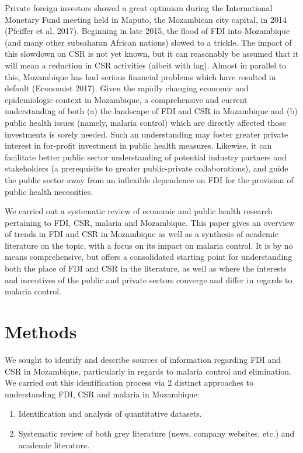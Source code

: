 \documentclass[]{article}
\providecommand{\tightlist}{%
  \setlength{\itemsep}{0pt}\setlength{\parskip}{0pt}}
\begin{document}
Private foreign investors showed a great optimism during the
International Monetary Fund meeting held in Maputo, the Mozambican city
capital, in 2014 (Pfeiffer et al. 2017). Beginning in late 2015, the
flood of FDI into Mozambique (and many other subsaharan African nations)
slowed to a trickle. The impact of this slowdown on CSR is not yet
known, but it can reasonably be assumed that it will mean a reduction in
CSR activities (albeit with lag). Almost in parallel to this, Mozambique
has had serious financial problems which have resulted in default
(Economist 2017). Given the rapidly changing economic and epidemiologic
context in Mozambique, a comprehensive and current understanding of both
(a) the landscape of FDI and CSR in Mozambique and (b) public health
issues (namely, malaria control) which are directly affected those
investments is sorely needed. Such an understanding may foster greater
private interest in for-profit investment in public health measures.
Likewise, it can facilitate better public sector understanding of
potential industry partners and stakeholders (a prerequisite to greater
public-private collaborations), and guide the public sector away from an
inflexible dependence on FDI for the provision of public health
necessities.

We carried out a systematic review of economic and public health
research pertaining to FDI, CSR, malaria and Mozambique. This paper
gives an overview of trends in FDI and CSR in Mozambique as well as a
synthesis of academic literature on the topic, with a focus on its
impact on malaria control. It is by no means comprehensive, but offers a
consolidated starting point for understanding both the place of FDI and
CSR in the literature, as well as where the interests and incentives of
the public and private sectors converge and differ in regards to malaria
control.

\section{Methods}\label{methods}

We sought to identify and describe sources of information regarding FDI
and CSR in Mozambique, particularly in regards to malaria control and
elimination. We carried out this identification process via 2 distinct
approaches to understanding FDI, CSR and malaria in Mozambique:

\begin{enumerate}
\def\labelenumi{\arabic{enumi}.}
\tightlist
\item
  Identification and analysis of quantitative datasets.
\item
  Systematic review of both grey literature (news, company websites,
  etc.) and academic literature.
\end{enumerate}
\end{document}
